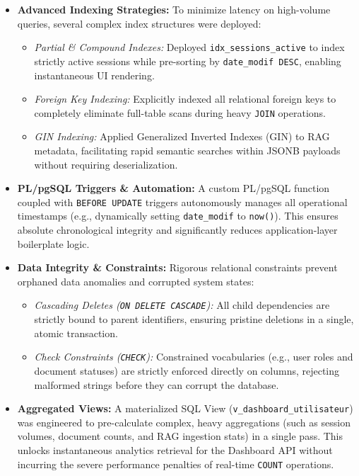 \begin{itemize}
    \item \textbf{Advanced Indexing Strategies:} To minimize latency on high-volume queries, several complex index structures were deployed:
    \begin{itemize}
        \item \textit{Partial \& Compound Indexes:} Deployed \texttt{idx\_sessions\_active} to index strictly active sessions while pre-sorting by \texttt{date\_modif DESC}, enabling instantaneous UI rendering.
        \item \textit{Foreign Key Indexing:} Explicitly indexed all relational foreign keys to completely eliminate full-table scans during heavy \texttt{JOIN} operations.
        \item \textit{GIN Indexing:} Applied Generalized Inverted Indexes (GIN) to RAG metadata, facilitating rapid semantic searches within JSONB payloads without requiring deserialization.
    \end{itemize}
    
    \item \textbf{PL/pgSQL Triggers \& Automation:} A custom PL/pgSQL function coupled with \texttt{BEFORE UPDATE} triggers autonomously manages all operational timestamps (e.g., dynamically setting \texttt{date\_modif} to \texttt{now()}). This ensures absolute chronological integrity and significantly reduces application-layer boilerplate logic.
    
    \item \textbf{Data Integrity \& Constraints:} Rigorous relational constraints prevent orphaned data anomalies and corrupted system states:
    \begin{itemize}
        \item \textit{Cascading Deletes (\texttt{ON DELETE CASCADE}):} All child dependencies are strictly bound to parent identifiers, ensuring pristine deletions in a single, atomic transaction.
        \item \textit{Check Constraints (\texttt{CHECK}):} Constrained vocabularies (e.g., user roles and document statuses) are strictly enforced directly on columns, rejecting malformed strings before they can corrupt the database.
    \end{itemize}
    
    \item \textbf{Aggregated Views:} A materialized SQL View (\texttt{v\_dashboard\_utilisateur}) was engineered to pre-calculate complex, heavy aggregations (such as session volumes, document counts, and RAG ingestion stats) in a single pass. This unlocks instantaneous analytics retrieval for the Dashboard API without incurring the severe performance penalties of real-time \texttt{COUNT} operations.
\end{itemize}

